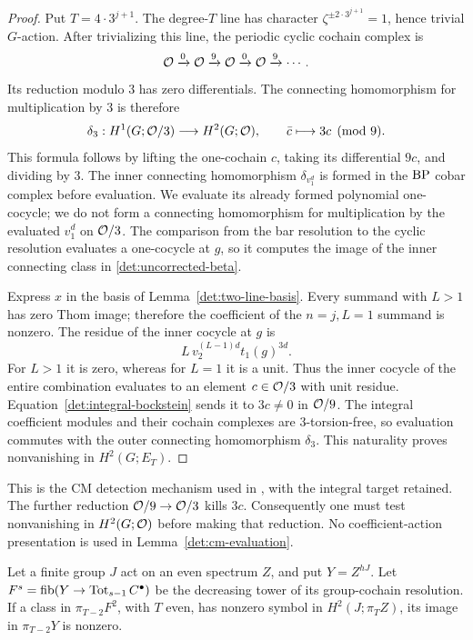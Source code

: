 \begin{proof}
Put \(T=4\cdot3^{j+1}\).
The degree-\(T\) line has character
\(\zeta^{\pm2\cdot3^{j+1}}=1\), hence trivial \(G\)-action.
After trivializing this line, the periodic cyclic cochain
complex is
\[
 \mathcal O\xrightarrow{0}\mathcal O\xrightarrow{9}\mathcal O
       \xrightarrow{0}\mathcal O\xrightarrow{9}\cdots.
\]
Its reduction modulo \(3\) has zero differentials.
The connecting homomorphism for multiplication by \(3\)
is therefore
\begin{equation}\label{det:integral-bockstein}
 \delta_3:H^1(G;\mathcal O/3)\longrightarrow H^2(G;\mathcal O),
 \qquad
 \bar c\longmapsto3c\pmod9 .
\end{equation}
This formula follows by lifting the one-cochain \(c\),
taking its differential \(9c\), and dividing by \(3\).
The inner connecting homomorphism \(\delta_{v_1^d}\) is
formed in the \(\mathrm{BP}\) cobar complex before evaluation.
We evaluate its already formed polynomial one-cocycle;
we do not form a connecting homomorphism for multiplication
by the evaluated \(v_1^d\) on \(\mathcal O/3\).
The comparison from the bar resolution to the cyclic
resolution evaluates a one-cocycle at \(g\), so it computes
the image of the inner connecting class in
\eqref{det:uncorrected-beta}.

Express \(x\) in the basis of Lemma~\ref{det:two-line-basis}.
Every summand with \(L>1\) has zero Thom image; therefore the
coefficient of the \(n=j,L=1\) summand is nonzero.
The residue of the inner cocycle at \(g\) is
\[
 L\,v_2^{(L-1)d}t_1(g)^{3d}.
\]
For \(L>1\) it is zero, whereas for \(L=1\) it is a unit.
Thus the inner cocycle of the entire combination evaluates
to an element \(c\in\mathcal O/3\) with unit residue.
Equation~\eqref{det:integral-bockstein} sends it to
\(3c\ne0\) in \(\mathcal O/9\).
The integral coefficient modules and their cochain complexes
are \(3\)-torsion-free, so evaluation commutes with the
outer connecting homomorphism \(\delta_3\).
This naturality proves nonvanishing in \(H^2(G;E_T)\).
\end{proof}

\begin{remark}\label{det:integral-target}
This is the CM detection mechanism used in
\cite[Section~6]{BR}, with the integral target retained.
The further reduction
\(\mathcal O/9\to\mathcal O/3\) kills \(3c\).
Consequently one must test nonvanishing in
\(H^2(G;\mathcal O)\) before making that reduction.
No coefficient-action presentation is used in
Lemma~\ref{det:cm-evaluation}.
\end{remark}

\begin{lemma}
\label{det:two-layer}
Let a finite group \(J\) act on an even spectrum \(Z\), and put
\(Y=Z^{hJ}\).
Let \(F^s=\operatorname{fib}(Y\to\operatorname{Tot}_{s-1}C^\bullet)\)
be the decreasing tower of its group-cochain resolution.
If a class in \(\pi_{T-2}F^2\), with \(T\) even, has nonzero
symbol in \(H^2(J;\pi_T Z)\), its image in \(\pi_{T-2}Y\)
is nonzero.
\end{lemma}

